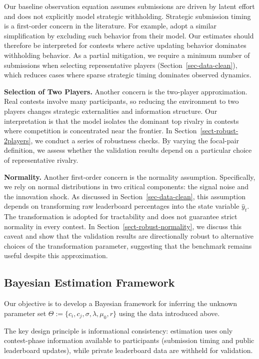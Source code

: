 \documentclass[mnsc]{informs3}
\begin{document}
Our baseline observation equation assumes submissions are driven by latent effort and does not explicitly model strategic withholding.
Strategic submission timing is a first-order concern in the literature.
For example, \citet{lemus2021dynamic} adopt a similar simplification by excluding such behavior from their model.
Our estimates should therefore be interpreted for contests where active updating behavior dominates withholding behavior.
As a partial mitigation, we require a minimum number of submissions when selecting representative players (Section~\ref{sec-data-clean}), which reduces cases where sparse strategic timing dominates observed dynamics.


\textbf{Selection of Two Players.}
Another concern is the two-player approximation.
Real contests involve many participants, so reducing the environment to two players changes strategic externalities and information structure.
Our interpretation is that the model isolates the dominant top rivalry in contests where competition is concentrated near the frontier.
In Section~\ref{sect-robust-2players}, we conduct a series of robustness checks.
By varying the focal-pair definition, we assess whether the validation results depend on a particular choice of representative rivalry.

\textbf{Normality.}
Another first-order concern is the normality assumption.
Specifically, we rely on normal distributions in two critical components: the signal noise and the innovation shock.
As discussed in Section~\ref{sec-data-clean}, this assumption depends on transforming raw leaderboard percentages into the state variable $\hat{y}_t$.
The transformation is adopted for tractability and does not guarantee strict normality in every contest.
In Section~\ref{sect-robust-normality}, we discuss this caveat and show that the validation results are directionally robust to alternative choices of the transformation parameter, suggesting that the benchmark remains useful despite this approximation.



\subsection{Bayesian Estimation Framework}

Our objective is to develop a Bayesian framework for inferring the unknown parameter set $\Theta := \{ c_i, c_j, \sigma, \lambda, \mu_0,r \}$ using the data introduced above.

The key design principle is informational consistency: estimation uses only contest-phase information available to participants (submission timing and public leaderboard updates), while private leaderboard data are withheld for validation.
\end{document}
